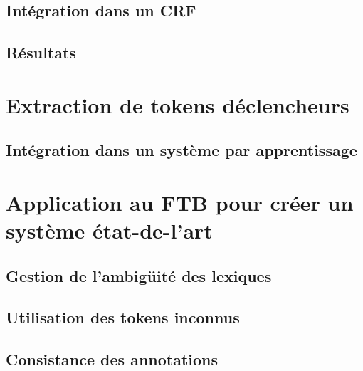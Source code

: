 \documentclass[12pt,a4paper,times,twoside,openright]{report}
\begin{document}
        \subsection{Intégration dans un CRF}
        \label{subsec:CRF-morphology}
        
        
        \subsection{Résultats}
        \label{subsec:ML-morphology-results}
        
    
    \section{Extraction de tokens déclencheurs}
    \label{sec:keyword-extraction}
    

        \subsection{Intégration dans un système par apprentissage}
        \label{subsec:ontology-integration}
        

    \section{Application au FTB pour créer un système état-de-l'art}
    \label{sec:taxonomy-ftb}
    

        \subsection{Gestion de l'ambigüité des lexiques}
        \label{subsec:taxonomy-ftb-priorities}
        

        \subsection{Utilisation des tokens inconnus}
        \label{subsec:taxonomy-ftb-unknown}
        

        \subsection{Consistance des annotations}
        \label{subsec:taxonomy-ftb-consistency}
        
\end{document}
